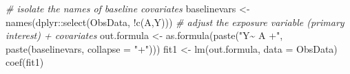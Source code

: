 \documentclass[
]{book}
\newenvironment{Shaded}{\begin{snugshade}}{\end{snugshade}}
\newcommand{\AttributeTok}[1]{\textcolor[rgb]{0.77,0.63,0.00}{#1}}
\newcommand{\CommentTok}[1]{\textcolor[rgb]{0.56,0.35,0.01}{\textit{#1}}}
\newcommand{\FunctionTok}[1]{\textcolor[rgb]{0.00,0.00,0.00}{#1}}
\newcommand{\NormalTok}[1]{#1}
\newcommand{\OtherTok}[1]{\textcolor[rgb]{0.56,0.35,0.01}{#1}}
\newcommand{\SpecialCharTok}[1]{\textcolor[rgb]{0.00,0.00,0.00}{#1}}
\newcommand{\StringTok}[1]{\textcolor[rgb]{0.31,0.60,0.02}{#1}}
\begin{document}
\begin{Shaded}
\begin{Highlighting}[]
\CommentTok{\# isolate the names of baseline covariates}
\NormalTok{baselinevars }\OtherTok{\textless{}{-}} \FunctionTok{names}\NormalTok{(dplyr}\SpecialCharTok{::}\FunctionTok{select}\NormalTok{(ObsData, }\SpecialCharTok{!}\FunctionTok{c}\NormalTok{(A,Y)))}
\CommentTok{\# adjust the exposure variable (primary interest) + covariates}
\NormalTok{out.formula }\OtherTok{\textless{}{-}} \FunctionTok{as.formula}\NormalTok{(}\FunctionTok{paste}\NormalTok{(}\StringTok{"Y\textasciitilde{} A +"}\NormalTok{, }
                               \FunctionTok{paste}\NormalTok{(baselinevars, }
                                     \AttributeTok{collapse =} \StringTok{"+"}\NormalTok{)))}
\NormalTok{fit1 }\OtherTok{\textless{}{-}} \FunctionTok{lm}\NormalTok{(out.formula, }\AttributeTok{data =}\NormalTok{ ObsData)}
\FunctionTok{coef}\NormalTok{(fit1)}
\end{Highlighting}
\end{Shaded}
\end{document}
